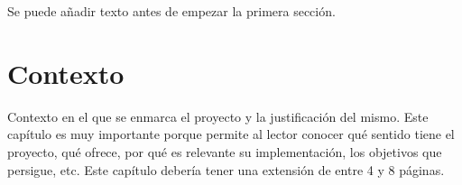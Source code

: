 Se puede añadir texto antes de empezar la primera sección.


\section{Contexto}

Contexto en el que se enmarca el proyecto y la justificación del mismo. Este capítulo es muy importante porque permite al lector conocer qué sentido tiene el proyecto, qué ofrece, por qué es relevante su implementación, los objetivos que persigue, etc. Este capítulo debería tener una extensión de entre 4 y 8 páginas.
